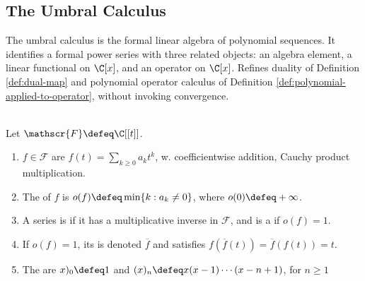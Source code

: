 \subsection{The Umbral Calculus}


The umbral calculus is the formal linear algebra of polynomial sequences. It identifies a formal power series with three related objects: an algebra element, a linear functional on $\C[x]$, and an operator on $\C[x]$. Refines duality of Definition \ref{def:dual-map} and polynomial operator calculus of Definition \ref{def:polynomial-applied-to-operator}, without invoking convergence.

\begin{definition} \label{def:formal-power-series-umbral-calculus} \\
Let $\mathscr{F}\defeq\C[[t]]$.
\begin{enumerate}[label=(\roman*)]
\setlength{\itemsep}{0pt}
\item $f \in \mathscr{F}$ are  $f(t)=\sum\limits_{k\geq0}a_kt^k$, w. coefficientwise addition, Cauchy product multiplication.
\item The  of $f$ is $o(f)\defeq \min\{k:a_k\neq0\}$, where $o(0)\defeq+\infty$.
\item A series is  if it has a multiplicative inverse in $\mathscr{F}$, and is a  if $o(f)=1$.
\item If $o(f)=1$, its  is denoted $\overline f$ and satisfies $f(\overline f(t))=\overline f(f(t))=t$.
\item The  are $x)_0\defeq1$ and $(x)_n\defeq x(x-1)\cdots(x-n+1)$, for $n\geq1$
\end{enumerate}
\end{definition}


